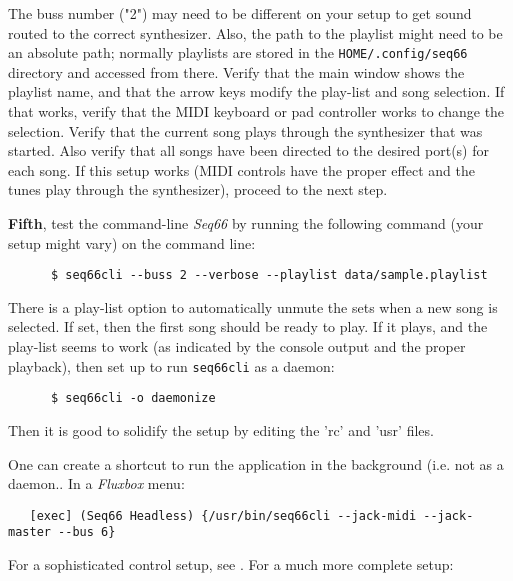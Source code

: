    The buss number ("2") may need to be different on your setup to get sound
   routed to the correct synthesizer.
   Also, the path to the playlist might
   need to be an absolute path; normally playlists are stored in the
   \texttt{HOME/.config/seq66} directory and accessed from there.
   Verify that the main window shows the playlist name,
   and that the arrow keys modify the
   play-list and song selection.
   If that works, verify that the MIDI keyboard
   or pad controller works to change the selection.
   Verify that the current
   song plays through the synthesizer that was started.
   Also verify that all
   songs have been directed to the desired port(s) for each song.
   If this setup works (MIDI controls have the proper effect and the tunes play
   through the synthesizer), proceed to the next step.

   \textbf{Fifth}, test the command-line \textsl{Seq66} by running the
   following command (your setup might vary) on the command line:

   \begin{verbatim}
      $ seq66cli --buss 2 --verbose --playlist data/sample.playlist
   \end{verbatim}

   There is a play-list option to automatically unmute the sets when a new song
   is selected.  If set, then the first song should be ready to play.
   If it plays, and the play-list seems to work (as indicated by the console
   output and the proper playback), then set up to run \texttt{seq66cli}
   as a daemon:

   \begin{verbatim}
      $ seq66cli -o daemonize
   \end{verbatim}

   Then it is good to solidify the setup by editing the 'rc' and 'usr' files.

   One can create a shortcut to run the application in the background (i.e. not
   as a daemon..
   In a \textsl{Fluxbox} menu:

   \begin{verbatim}
   [exec] (Seq66 Headless) {/usr/bin/seq66cli --jack-midi --jack-master --bus 6}
   \end{verbatim}

   For a sophisticated control setup, see .
   For a much more complete setup:

